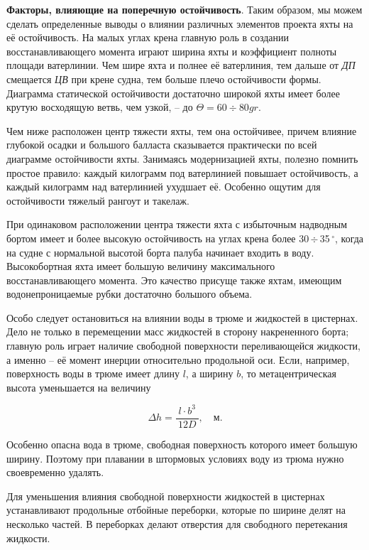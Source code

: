 \documentclass[a4paper, 12pt, twoside, final, book, russian, fittopage, cyremdash]{ncc}
\newcommand{\gr}{\ensuremath{\,^\circ}\xspace}
\newcommand{\otdo}{\,\ensuremath{\div}\,}
\newcommand{\motdo}{\div}
\begin{document}
\textbf{Факторы, влияющие на поперечную остойчивость}. Таким образом, мы можем сделать определенные выводы о влиянии различных элементов проекта яхты на её остойчивость. На малых углах крена главную роль в создании восстанавливающего момента играют ширина яхты и коэффициент полноты площади ватерлинии. Чем шире яхта и полнее её ватерлиния, тем дальше от \textit{ДП} смещается \textit{ЦВ} при крене судна, тем больше плечо остойчивости формы. Диаграмма статической остойчивости достаточно широкой яхты имеет более крутую восходящую ветвь, чем узкой, \--- до $\Theta = 60 \motdo 80gr$. 

Чем ниже расположен центр тяжести яхты, тем она остойчивее, причем влияние глубокой осадки и большого балласта сказывается практически по всей диаграмме остойчивости яхты. Занимаясь модернизацией яхты, полезно помнить простое правило: каждый килограмм под ватерлинией повышает остойчивость, а каждый килограмм над ватерлинией ухудшает её. Особенно ощутим для остойчивости тяжелый рангоут и такелаж.

При одинаковом расположении центра тяжести яхта с избыточным надводным бортом имеет и более высокую остойчивость на углах крена более 30\otdo 35\gr, когда на судне с нормальной высотой борта палуба начинает входить в воду. Высокобортная яхта имеет большую величину максимального восстанавливающего момента. Это качество присуще также яхтам, имеющим водонепроницаемые рубки достаточно большого объема. 

Особо следует остановиться на влиянии воды в трюме и жидкостей в цистернах. Дело не только в перемещении масс жидкостей в сторону накрененного борта; главную роль играет наличие свободной поверхности переливающейся жидкости, а именно \--- её момент инерции относительно продольной оси. Если, например, поверхность воды в трюме имеет длину $l$, а ширину $b$, то метацентрическая высота уменьшается на величину

\begin{equation}
  \Delta h = \frac{l \cdot b^3}{\ 12D\ }, \quad \text{м.}
\end{equation}

Особенно опасна вода в трюме, свободная поверхность которого имеет большую ширину. Поэтому при плавании в штормовых условиях воду из трюма нужно своевременно удалять.

Для уменьшения влияния свободной поверхности жидкостей в цистернах устанавливают продольные отбойные переборки, которые по ширине делят на несколько частей. В переборках делают отверстия для свободного перетекания жидкости.
\end{document}
